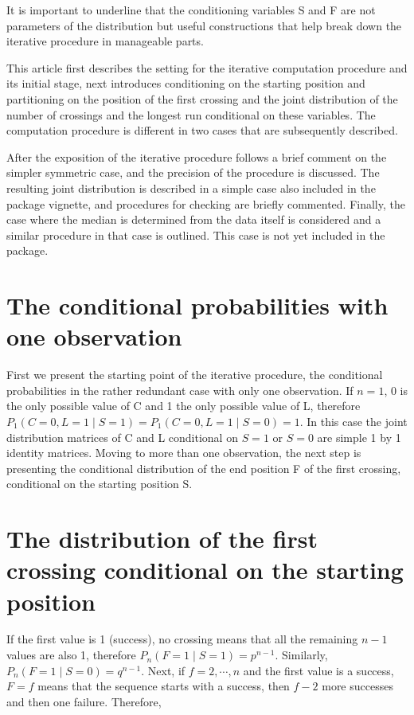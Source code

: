 It is important to underline that the conditioning variables S and F are not parameters of the distribution but useful constructions that help break down the iterative procedure in manageable parts.

This article first describes the setting for the iterative computation procedure and its initial stage, next introduces conditioning on the starting position and partitioning on the position of the first crossing and the joint distribution of the number of crossings and the longest run conditional on these variables. The computation procedure is different in two cases that are subsequently described. 

After the exposition of the iterative procedure follows a brief comment on the simpler symmetric case, and the precision of the procedure is discussed. The resulting joint distribution is described in a simple case also included in the package vignette, and procedures for checking are briefly commented.
Finally, the case where the median is determined from the data itself is considered and a similar procedure in that case is outlined. This case is not yet included in the  package.

\section{The conditional probabilities with one observation}

First we present the starting point of the iterative procedure, the conditional probabilities in  the rather redundant case with only one observation. If $n = 1$, 0 is the only possible value of C and 1 the only possible value of L, therefore $P_1 (C=0,L=1 \mid S=1) = P_1 (C=0,L=1 \mid S=0) = 1$. In this case the joint distribution matrices of C and L conditional on $S=1$ or $S=0$ are simple 1 by 1 identity matrices. Moving to more than one observation, the next step is presenting the conditional distribution of the end position F of the first crossing, conditional on the starting position S.

\section{The distribution of the first crossing conditional on the starting position}

If the first value is 1 (success), no crossing means that all the remaining $n-1$ values are also 1, therefore $P_n (F=1 \mid S=1) = p^{n-1}$. Similarly, $P_n(F=1 \mid S=0) = q^{n-1}$. Next, if $f=2, \cdots ,n$ and the first value is a success, $F=f$ means that the sequence starts with a success, then $f-2$ more successes and then one failure. Therefore, 

